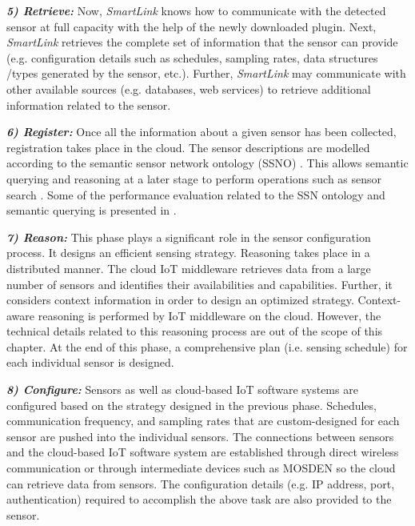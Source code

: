 \documentclass[graybox]{svmult}
\begin{document}
\textit{\textbf{5) Retrieve:}} Now, \textit{SmartLink} knows how to communicate with the detected sensor at full capacity with the help of the newly downloaded plugin. Next, \textit{SmartLink} retrieves the complete set of information that the sensor can provide (e.g. configuration details such as schedules, sampling rates, data structures /types generated by the sensor, etc.). Further, \textit{SmartLink} may communicate with other available sources (e.g. databases, web services) to retrieve additional information related to the sensor.




\textit{\textbf{6) Register:}} Once all the information about a given sensor has been collected, registration takes place in the cloud. The sensor descriptions are modelled according to the semantic sensor network ontology (SSNO) \cite{P626}. This allows semantic querying and reasoning at a later stage to perform operations such as sensor search \cite{ZMP006}. Some of the performance evaluation related to the SSN ontology and semantic querying is presented in \cite{ZMP011}.




\textit{\textbf{7) Reason:}} This phase plays a significant role in the sensor configuration process. It designs an efficient sensing strategy. Reasoning takes place in a distributed manner. The cloud IoT middleware retrieves data from a large number of sensors and identifies their availabilities and capabilities. Further, it considers context information in order to design an optimized strategy. Context-aware reasoning is performed by IoT middleware on the cloud. However, the technical details related to this reasoning process are out of the scope of this chapter. At the end of this phase, a comprehensive plan (i.e. sensing schedule) for each individual sensor is designed. 




\textit{\textbf{8) Configure:}} Sensors as well as cloud-based IoT software systems are configured based on the strategy designed in the previous phase. Schedules, communication frequency, and sampling rates that are custom-designed for each sensor are pushed into the individual sensors. The connections between sensors and the cloud-based IoT software system are established through direct wireless communication or through intermediate devices such as MOSDEN \cite{ZMP009} so the cloud can retrieve data from sensors. The configuration details (e.g. IP address, port, authentication) required to accomplish the above task are also provided to the sensor.
\end{document}
